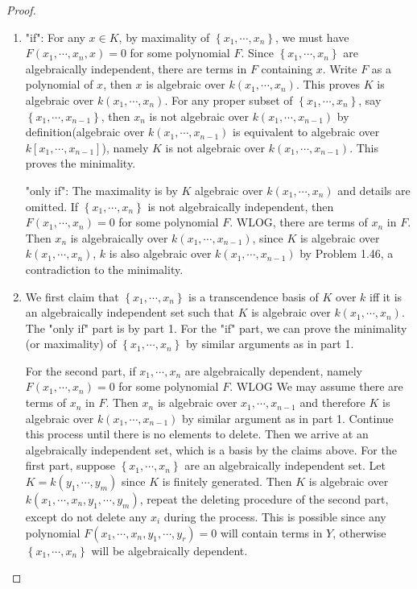 \documentclass{solution}
\begin{document}
\begin{proof}
    \begin{enumerate}
        \item "if": For any $x \in K$, by maximality of $\left\lbrace x_1, \cdots, x_n \right\rbrace$, we must have $F(x_1, \cdots, x_n, x) = 0$ for some polynomial $F$. Since $\left\lbrace x_1, \cdots, x_n \right\rbrace$ are algebraically independent, there are terms in $F$ containing $x$. Write $F$ as a polynomial of $x$, then $x$ is algebraic over $k(x_1, \cdots, x_n)$. This proves $K$ is algebraic over $k(x_1, \cdots, x_n)$. For any proper subset of $\left\lbrace x_1, \cdots, x_n \right\rbrace$, say $\left\lbrace x_1, \cdots, x_{n - 1} \right\rbrace$, then $x_n$ is not algebraic over $k(x_1, \cdots, x_{n - 1})$ by definition(algebraic over $k(x_1, \cdots, x_{n - 1})$ is equivalent to algebraic over $k[x_1, \cdots, x_{n - 1}]$), namely $K$ is not algebraic over $k(x_1, \cdots, x_{n - 1})$. This proves the minimality.
        
        "only if": The maximality is by $K$ algebraic over $k(x_1, \cdots, x_n)$ and details are omitted. If $\left\lbrace x_1, \cdots, x_n \right\rbrace$ is not algebraically independent, then $F(x_1, \cdots, x_n) = 0$ for some polynomial $F$. WLOG, there are terms of $x_n$ in $F$. Then $x_n$ is algebraically over $k(x_1, \cdots, x_{n - 1})$, since $K$ is algebraic over $k(x_1, \cdots, x_{n})$, $k$ is also algebraic over $k(x_1, \cdots, x_{n - 1})$ by Problem 1.46, a contradiction to the minimality.
        \item We first claim that $\left\lbrace x_1, \cdots, x_n \right\rbrace$ is a transcendence basis of $K$ over $k$ iff it is an algebraically independent set such that $K$ is algebraic over $k(x_1, \cdots, x_n)$. The "only if" part is by part 1. For the "if" part, we can prove the minimality (or maximality) of $\left\lbrace x_1, \cdots, x_n \right\rbrace$ by similar arguments as in part 1.
        
        For the second part, if $x_1, \cdots, x_n$ are algebraically dependent, namely $F(x_1, \cdots, x_n) = 0$ for some polynomial $F$. WLOG We may assume there are terms of $x_n$ in $F$. Then $x_n$ is algebraic over $x_1, \cdots, x_{n - 1}$ and therefore $K$ is algebraic over $k(x_1, \cdots, x_{n - 1})$ by similar argument as in part 1. Continue this process until there is no elements to delete. Then we arrive at an algebraically independent set, which is a basis by the claims above. For the first part, suppose $\left\lbrace x_1, \cdots, x_n \right\rbrace$ are an algebraically independent set. Let $K = k(y_1, \cdots, y_m)$ since $K$ is finitely generated. Then $K$ is algebraic over $k(x_1, \cdots, x_n, y_1,\cdots, y_m)$, repeat the deleting procedure of the second part, except do not delete any $x_i$ during the process. This is possible since any polynomial $F(x_1, \cdots, x_n, y_1, \cdots, y_r) = 0$ will contain terms in $Y$, otherwise $\left\lbrace x_1, \cdots, x_n \right\rbrace$ will be algebraically dependent.


\end{enumerate}
\end{proof}
\end{document}
